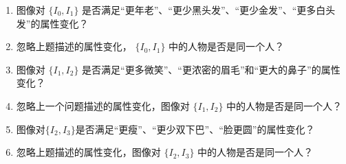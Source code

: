 \begin{enumerate}
\item 图像对 $\{I_0, I_1\}$ 是否满足“更年老”、“更少黑头发”、“更少金发”、“更多白头发”的属性变化？

\item 忽略上题描述的属性变化， $\{I_0, I_1\}$ 中的人物是否是同一个人？

\item 图像对 $\{I_1, I_2\}$ 是否满足“更多微笑”、“更浓密的眉毛”和“更大的鼻子”的属性变化？

\item 忽略上一个问题描述的属性变化，图像对 $\{I_1, I_2\}$ 中的人物是否是同一个人？

\item 图像对$\{I_2, I_3\}$是否满足“更瘦”、“更少双下巴”、“脸更圆”的属性变化？

\item 忽略上题描述的属性变化，图像对 $\{I_2, I_3\}$ 中的人物是否是同一个人？
\end{enumerate}






